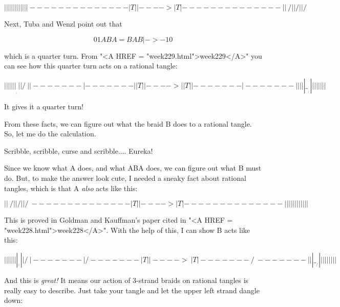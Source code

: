 $$
  |   |                |   |
  |   |                |   |
  |   |                |   |
 -------              -------
 |  T  |   |---->     |  T  |        
 -------              -------
  |   |                 \ /
  |   |                  / 
  |   |                 / \
$$
    
Next, Tuba and Wenzl point out that

$$
                  0   1
ABA = BAB |-> 
                 -1   0
$$
    

which is a quarter turn.  From "<A HREF =
"week229.html">week229</A>" you can see how this quarter turn
acts on a rational tangle:

$$
  |   |                       |     | 
  |   |              ____     |     |
  |   |             /     \   |     |
 -------           |     -------    |
 |  T  |   |---->  |     |  T  |    |    
 -------           |     -------    |
  |   |            |      |   \____/
  |   |            |      |    
  |   |            |      |  
$$
    
It gives it a quarter turn!      

From these facts, we can figure out what the braid B does to a 
rational tangle.  So, let me do the calculation.  

Scribble, scribble, curse and scribble.... Eureka!

Since we know what A does, and what ABA does, we can figure out 
what B must do.  But, to make the answer look cute, I needed a 
sneaky fact about rational tangles, which is that A \emph{also} acts 
like this:

$$
  |   |                 \ / 
  |   |                  /
  |   |                 / \ 
 -------              -------
 |  T  |   |---->     |  T  |        
 -------              -------
  |   |                |   |
  |   |                |   | 
  |   |                |   |
$$
    
This is proved in Goldman and Kauffman's paper cited in "<A HREF = "week228.html">week228</A>".
With the help of this, I can show B acts like this:

$$
  |   |              |          |
  |   |              |   ___    |
  |   |              |  /   \   |
 -------             | /    -------   
 |  T  |   |---->     \     |  T  |  
 -------             / \    ------- 
  |   |             |   \___/   | 
  |   |             |           | 
  |   |             |           |
$$
    
And this is \emph{great!}  It means our action of 3-strand braids on 
rational tangles is really easy to describe.  Just take your tangle
and let the upper left strand dangle down:

